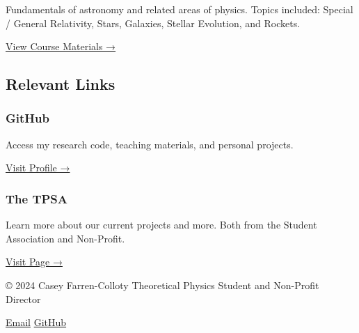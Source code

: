 \documentclass{article}
\begin{document}
Fundamentals of astronomy and related areas of physics. Topics included:
Special / General Relativity, Stars, Galaxies, Stellar Evolution, and
Rockets.

\href{https://github.com/farrencc/ctyi_astronomy}{View Course Materials
→}

\label{links}
\subsection{Relevant Links}\label{relevant-links}

\subsubsection{GitHub}\label{github}

Access my research code, teaching materials, and personal projects.

\href{https://github.com/farrencc}{Visit Profile →}

\subsubsection{The TPSA}\label{the-tpsa}

Learn more about our current projects and more. Both from the Student
Association and Non-Profit.

\href{https://www.tpsa.ie}{Visit Page →}

© 2024 Casey Farren-Colloty \textbar{} Theoretical Physics Student and
Non-Profit Director

\href{mailto:casey@tpsa.ie}{Email}
\href{https://github.com/farrencc}{GitHub}
\end{document}
